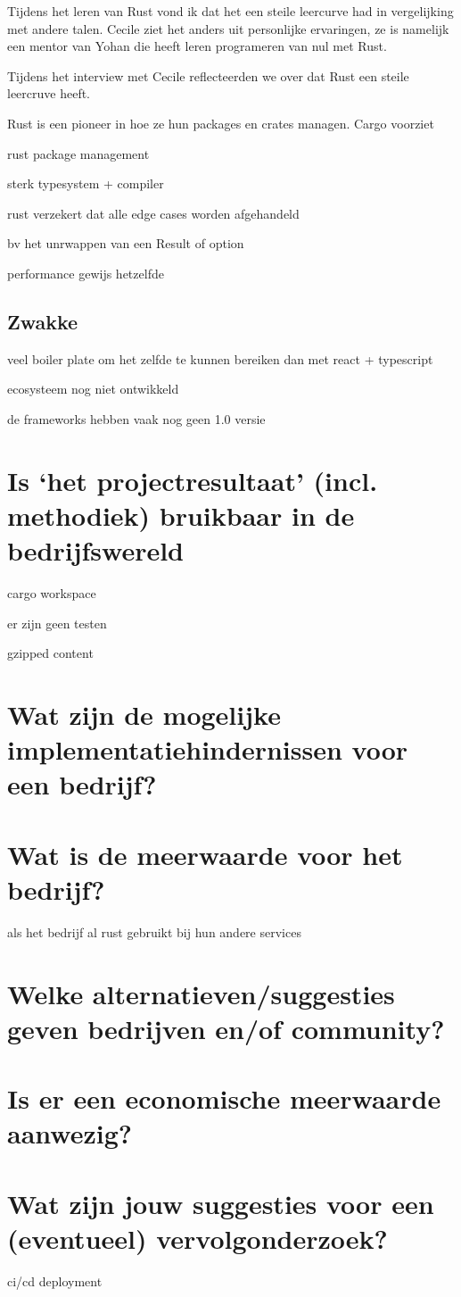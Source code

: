 Tijdens het leren van Rust vond ik dat het een steile leercurve had in vergelijking met 
andere talen. Cecile ziet het anders uit personlijke ervaringen, ze is namelijk een mentor
van Yohan die heeft leren programeren van nul met Rust.

Tijdens het interview met Cecile reflecteerden we over dat Rust een steile leercruve heeft.


Rust is een pioneer in hoe ze hun packages en crates managen. Cargo voorziet 

rust package management

sterk typesystem + compiler

rust verzekert dat alle edge cases worden afgehandeld

bv het unrwappen van een Result of option


performance gewijs hetzelfde


\subsection{Zwakke}

veel boiler plate om het zelfde te kunnen bereiken dan met react + typescript

ecosysteem nog niet ontwikkeld

de frameworks hebben vaak nog geen 1.0 versie


\section{Is ‘het projectresultaat’ (incl. methodiek) bruikbaar in de bedrijfswereld}

cargo workspace

er zijn geen testen

gzipped content


\section{Wat zijn de mogelijke implementatiehindernissen voor een bedrijf?}




\section{Wat is de meerwaarde voor het bedrijf?}

als het bedrijf al rust gebruikt bij hun andere services


\section{Welke alternatieven/suggesties geven bedrijven en/of community?}


\section{Is er een economische meerwaarde aanwezig?}


\section{Wat zijn jouw suggesties voor een (eventueel) vervolgonderzoek?}

ci/cd deployment

